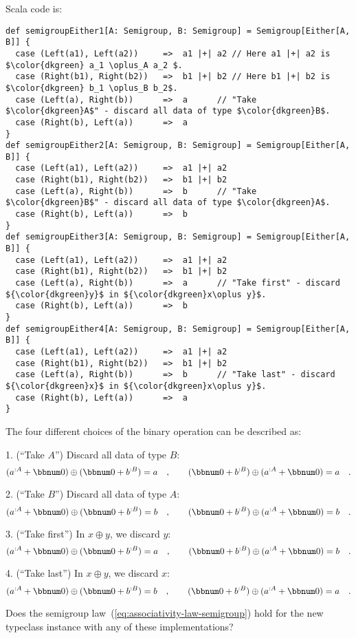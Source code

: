 Scala code is:
\begin{lstlisting}[mathescape=true]
def semigroupEither1[A: Semigroup, B: Semigroup] = Semigroup[Either[A, B]] {
  case (Left(a1), Left(a2))     =>  a1 |+| a2 // Here a1 |+| a2 is $\color{dkgreen} a_1 \oplus_A a_2 $.
  case (Right(b1), Right(b2))   =>  b1 |+| b2 // Here b1 |+| b2 is $\color{dkgreen} b_1 \oplus_B b_2$.
  case (Left(a), Right(b))      =>  a      // "Take $\color{dkgreen}A$" - discard all data of type $\color{dkgreen}B$.
  case (Right(b), Left(a))      =>  a
}
def semigroupEither2[A: Semigroup, B: Semigroup] = Semigroup[Either[A, B]] {
  case (Left(a1), Left(a2))     =>  a1 |+| a2
  case (Right(b1), Right(b2))   =>  b1 |+| b2
  case (Left(a), Right(b))      =>  b      // "Take $\color{dkgreen}B$" - discard all data of type $\color{dkgreen}A$.
  case (Right(b), Left(a))      =>  b
}
def semigroupEither3[A: Semigroup, B: Semigroup] = Semigroup[Either[A, B]] {
  case (Left(a1), Left(a2))     =>  a1 |+| a2
  case (Right(b1), Right(b2))   =>  b1 |+| b2
  case (Left(a), Right(b))      =>  a      // "Take first" - discard ${\color{dkgreen}y}$ in ${\color{dkgreen}x\oplus y}$.
  case (Right(b), Left(a))      =>  b
}
def semigroupEither4[A: Semigroup, B: Semigroup] = Semigroup[Either[A, B]] {
  case (Left(a1), Left(a2))     =>  a1 |+| a2
  case (Right(b1), Right(b2))   =>  b1 |+| b2
  case (Left(a), Right(b))      =>  b      // "Take last" - discard ${\color{dkgreen}x}$ in ${\color{dkgreen}x\oplus y}$.
  case (Right(b), Left(a))      =>  a
}
\end{lstlisting}
The four different choices of the binary operation can be described
as:

1. (\textsf{``}Take $A$\textsf{''}) Discard all data of type $B$: 
\[
(a^{:A}+\bbnum 0)\oplus(\bbnum 0+b^{:B})=a\quad,\quad\quad(\bbnum 0+b^{:B})\oplus(a^{:A}+\bbnum 0)=a\quad.
\]

2. (\textsf{``}Take $B$\textsf{''}) Discard all data of type $A$: 
\[
(a^{:A}+\bbnum 0)\oplus(\bbnum 0+b^{:B})=b\quad,\quad\quad(\bbnum 0+b^{:B})\oplus(a^{:A}+\bbnum 0)=b\quad.
\]

3. (\textsf{``}Take first\textsf{''}) In $x\oplus y$, we discard $y$: 
\[
(a^{:A}+\bbnum 0)\oplus(\bbnum 0+b^{:B})=a\quad,\quad\quad(\bbnum 0+b^{:B})\oplus(a^{:A}+\bbnum 0)=b\quad.
\]

4. (\textsf{``}Take last\textsf{''}) In $x\oplus y$, we discard $x$: 
\[
(a^{:A}+\bbnum 0)\oplus(\bbnum 0+b^{:B})=b\quad,\quad\quad(\bbnum 0+b^{:B})\oplus(a^{:A}+\bbnum 0)=a\quad.
\]

\noindent Does the semigroup law~(\ref{eq:associativity-law-semigroup})
hold for the new typeclass instance with any of these implementations?

